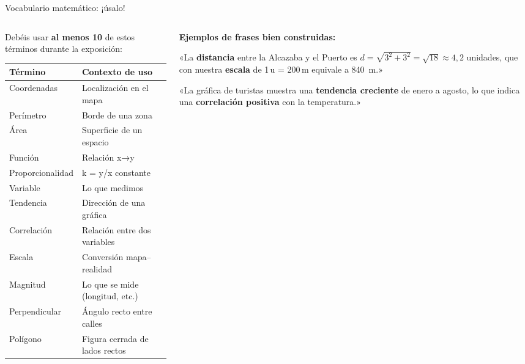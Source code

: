 \documentclass[aspectratio=169, 10pt, spanish]{beamer}
\begin{document}

\begin{frame}{Vocabulario matemático: ¡úsalo!}
  \begin{columns}[T]
    \begin{column}{0.48\textwidth}
      Debéis usar \textbf{al menos 10} de estos términos
      durante la exposición:

      \begin{center}
      \begin{tabular}{ll}
        \toprule
        \textbf{Término} & \textbf{Contexto de uso}\\
        \midrule
        Coordenadas & Localización en el mapa\\
        Perímetro   & Borde de una zona\\
        Área        & Superficie de un espacio\\
        Función     & Relación x→y\\
        Proporcionalidad & k = y/x constante\\
        Variable    & Lo que medimos\\
        Tendencia   & Dirección de una gráfica\\
        Correlación & Relación entre dos variables\\
        Escala      & Conversión mapa--realidad\\
        Magnitud    & Lo que se mide (longitud, etc.)\\
        Perpendicular & Ángulo recto entre calles\\
        Polígono    & Figura cerrada de lados rectos\\
        \bottomrule
      \end{tabular}
      \end{center}
    \end{column}
    \begin{column}{0.38\textwidth}
      \textbf{Ejemplos de frases bien construidas:}\\[6pt]
      \begin{tcolorbox}[colback=AlmVerde!8, colframe=AlmVerde,
                        arc=4pt, boxrule=0.5pt, fontupper=\AlmFontSmall]
        «La \textbf{distancia} entre la Alcazaba y el Puerto
        es $d = \sqrt{3^2+3^2} = \sqrt{18} \approx 4{,}2$
        unidades, que con nuestra \textbf{escala}
        de 1\,u = 200\,m equivale a \SI{840}{m}.»
      \end{tcolorbox}
      \vspace{6pt}
      \begin{tcolorbox}[colback=AlmVerde!8, colframe=AlmVerde,
                        arc=4pt, boxrule=0.5pt, fontupper=\AlmFontSmall]
        «La gráfica de turistas muestra una
        \textbf{tendencia creciente} de enero a agosto,
        lo que indica una \textbf{correlación positiva}
        con la temperatura.»
      \end{tcolorbox}
    \end{column}
  \end{columns}
\end{frame}
\end{document}
